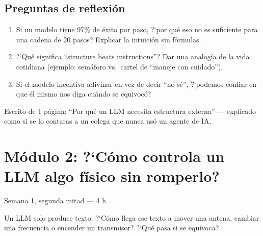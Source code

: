 \documentclass[11pt,a4paper]{article}
\newcommand{\timeest}[1]{\textsf{\footnotesize\color{muted}#1}}
\begin{document}
\subsection{Preguntas de reflexi\'on}
\begin{enumerate}[label=\textbf{R\arabic*.}]
  \item Si un modelo tiene 97\% de \'exito por paso, ?`por qu\'e eso no es suficiente para una cadena de 20 pasos? Explicar la intuici\'on sin f\'ormulas.
  \item ?`Qu\'e significa ``structure beats instructions''? Dar una analog\'ia de la vida cotidiana (ejemplo: sem\'aforo vs.\ cartel de ``maneje con cuidado'').
  \item Si el modelo incentiva adivinar en vez de decir ``no s\'e'', ?`podemos confiar en que \'el mismo nos diga cu\'ando se equivoc\'o?
\end{enumerate}

\begin{deliverbox}[Entregable]
Escrito de 1 p\'agina: ``Por qu\'e un LLM necesita estructura externa'' --- explicado como si se lo contaras a un colega que nunca us\'o un agente de IA.
\end{deliverbox}

\section{M\'odulo 2: ?`C\'omo controla un LLM algo f\'isico sin romperlo?}
\timeest{Semana 1, segunda mitad --- 4 h}

\begin{goalbox}
Un LLM solo produce texto. ?`C\'omo llega ese texto a mover una antena, cambiar una frecuencia o encender un transmisor? ?`Qu\'e pasa si se equivoca?
\end{goalbox}
\end{document}
